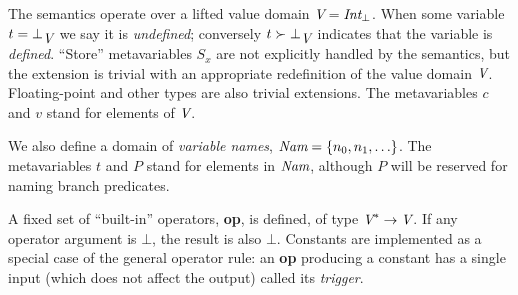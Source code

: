 \documentclass[12pt,notitlepage]{article}
\begin{document}
The semantics operate over a lifted value domain
${\mbox{\em V}}={\mbox{\em Int}}_\bot$. When some variable
$t = \bot_{\mbox{\em V}}$ we say it is
\emph{undefined}; conversely $t\succ\bot_{\mbox{\em V}}$ indicates that the
variable is \emph{defined}.  ``Store'' metavariables $S_x$ are not
explicitly handled by the semantics, but the extension is trivial with
an appropriate redefinition of the value domain ${\mbox{\em V}}$.  Floating-point
and other types are also trivial extensions.  The
metavariables $c$ and $v$ stand for elements of ${\mbox{\em V}}$.

We also define a domain of \emph{variable names},
${\mbox{\em Nam}}=\left\{n_0,n_1,\ldots\right\}$.  The metavariables $t$ and $P$ stand for
elements in ${\mbox{\em Nam}}$, although $P$ will be reserved for naming branch predicates.

A fixed set of ``built-in'' operators, \textbf{op}, is defined,
of type ${\mbox{\em V}}^* \to {\mbox{\em V}}$.  If any operator argument is $\bot$, the
result is also $\bot$.  Constants are implemented as a special case of
the general operator rule: an \textbf{op} producing a constant has a
single input (which does not affect the output) called its \emph{trigger}.
\end{document}
